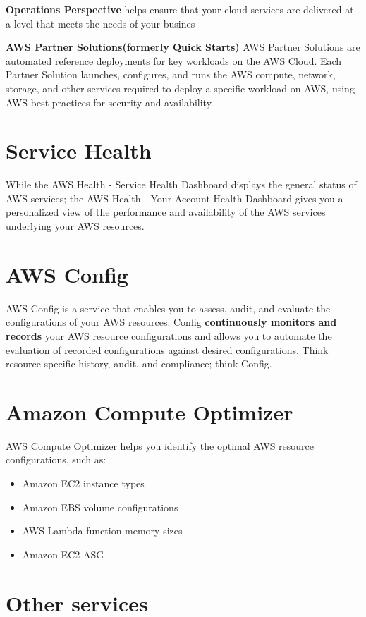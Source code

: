 \documentclass[12pt, letterpaper, twoside]{article}
\begin{document}
\textbf{Operations Perspective} helps ensure that your cloud services are delivered at a level that meets the needs 
of your busines

\textbf{AWS Partner Solutions(formerly Quick Starts)}
AWS Partner Solutions are automated reference deployments for key workloads on the AWS Cloud. Each Partner Solution 
launches, configures, and runs the AWS compute, network, storage, and other services required to deploy a specific 
workload on AWS, using AWS best practices for security and availability.\\

\section{Service Health}
While the AWS Health - Service Health Dashboard displays the general status of AWS services; the AWS Health - Your Account Health 
Dashboard gives you a personalized view of the performance and availability of the AWS services underlying your AWS resources.

\section{AWS Config}
AWS Config is a service that enables you to assess, audit, and evaluate the configurations of your AWS resources. 
Config \textbf{continuously monitors and records} your AWS resource configurations and allows you to automate the evaluation of 
recorded configurations against desired configurations. Think resource-specific history, audit, and compliance; think Config.

\section{Amazon Compute Optimizer}
AWS Compute Optimizer helps you identify the optimal AWS resource configurations, such as:
\begin{itemize}
	\item Amazon EC2 instance types
	\item Amazon EBS volume configurations
	\item AWS Lambda function memory sizes
	\item Amazon EC2 ASG
\end{itemize}

\section{Other services}
\end{document}
